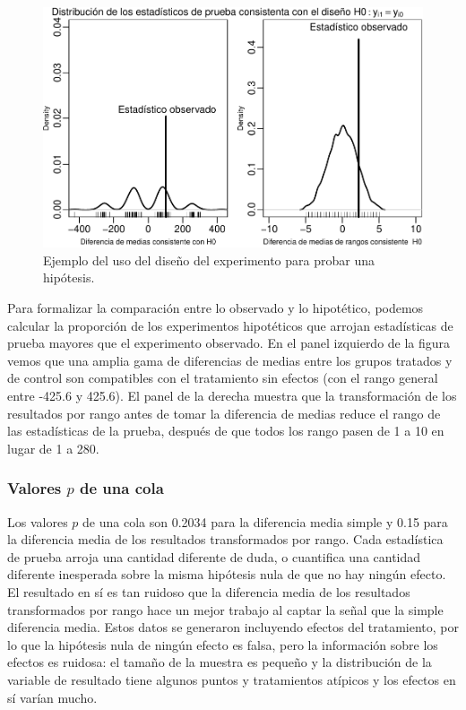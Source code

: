 \documentclass[
]{article}
\begin{document}
\begin{figure}
\includegraphics[width=.9\textwidth]{hypothesistesting_esp_files/figure-latex/unnamed-chunk-3-1} \caption{Ejemplo del uso del diseño del experimento para probar una hipótesis.}\label{fig:unnamed-chunk-3}
\end{figure}

Para formalizar la comparación entre lo observado y lo hipotético, podemos calcular la proporción de los experimentos hipotéticos que arrojan estadísticas de prueba mayores que el experimento observado. En el panel izquierdo de la figura vemos que una amplia gama de diferencias de medias entre los grupos tratados y de control son compatibles con el tratamiento sin efectos (con el rango general entre -425.6 y 425.6). El panel de la derecha muestra que la transformación de los resultados por rango antes de tomar la diferencia de medias reduce el rango de las estadísticas de la prueba, después de que todos los rango pasen de 1 a 10 en lugar de 1 a 280.

\hypertarget{valores-p-de-una-cola}{%
\subsubsection{\texorpdfstring{Valores \(p\) de una cola}{Valores p de una cola}}\label{valores-p-de-una-cola}}

Los valores \(p\) de una cola son 0.2034 para la diferencia media simple y 0.15 para la diferencia media de los resultados transformados por rango. Cada estadística de prueba arroja una cantidad diferente de duda, o cuantifica una cantidad diferente inesperada sobre la misma hipótesis nula de que no hay ningún efecto. El resultado en sí es tan ruidoso que la diferencia media de los resultados transformados por rango hace un mejor trabajo al captar la señal que la simple diferencia media. Estos datos se generaron incluyendo efectos del tratamiento, por lo que la hipótesis nula de ningún efecto es falsa, pero la información sobre los efectos es ruidosa: el tamaño de la muestra es pequeño y la distribución de la variable de resultado tiene algunos puntos y tratamientos atípicos y los efectos en sí varían mucho.
\end{document}
